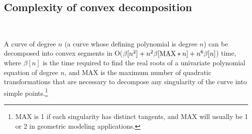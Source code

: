 \subsection{Complexity of convex decomposition}

\ \ \ 

\vspace{.1in}

\begin{theorem}
\label{thm-5}
A curve of degree $n$ {\rm (}a curve whose defining polynomial is 
degree $n${\rm )} 
can be decomposed into convex segments in
O{\rm (}$\beta[n^{2}] + n^{2}\beta[{\rm MAX} * n] + n^{6}\beta[n]${\rm )} 
time, 
where $\beta[n]$ is the time required to find the 
real roots of a univariate polynomial equation of degree $n$, and 
{\rm MAX} is the 
maximum number of quadratic transformations that are necessary to 
decompose any 
singularity of the curve into simple points.\footnote{MAX is 1 if each 
	singularity has distinct tangents, and MAX will usually be 1 or 2
	in geometric modeling applications. }
\end{theorem}

